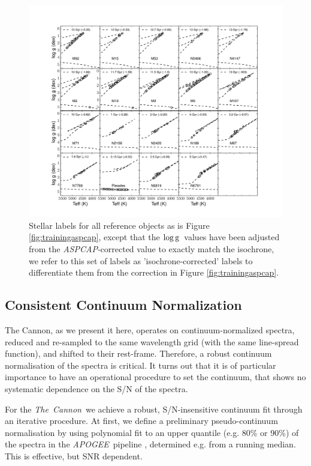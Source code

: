 \documentclass[12pt, preprint]{aastex}
\newcommand{\logg}{\mbox{$\rm \log g$}}
\newcommand{\tc}{\textsl{The~Cannon}}
\newcommand{\apogee}{\textsl{APOGEE}}
\newcommand{\aspcap}{\textsl{ASPCAP}}
\begin{document}
\begin{figure}[h!]
\centering
  \includegraphics[scale=0.33]{./plots/training_mkn2.pdf}
\caption{Stellar labels for all reference objects as is Figure \ref{fig:trainingaspcap}, except that the \logg\ values have been adjusted from the \aspcap-corrected value to exactly match the isochrone, we refer to this set of labels as  'isochrone-corrected' labels to differentiate them from the correction in Figure \ref{fig:trainingaspcap}.  }
\label{fig:trainingisochrone}
\end{figure}


\subsection{Consistent Continuum Normalization}\label{sec:ContNorm}

The Cannon, as we present it here, operates on continuum-normalized spectra, reduced and re-sampled to the same wavelength grid (with the same line-spread function), and shifted to their rest-frame. 
 Therefore, a robust continuum normalisation of the spectra is critical.
It turns out that it is of particular importance to have an operational procedure to set the continuum,
that shows no systematic dependence on the S/N of the spectra.

For the \tc\ we achieve a robust, S/N-insensitive continuum fit through 
an iterative procedure. At first, we define a preliminary pseudo-continuum normalisation by 
using polynomial fit to an upper quantile (e.g. 80\% or 90\%) of the spectra
 in the \apogee\ pipeline \citep{Meszaros2013}, determined e.g. from a running median.
  This is effective, but SNR dependent.
  
\end{document}
